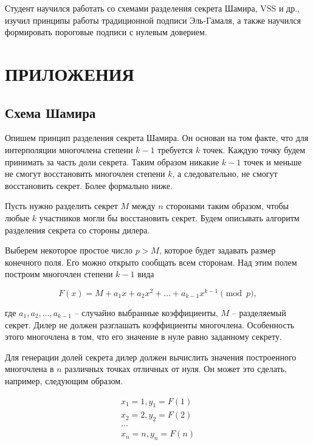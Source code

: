 \documentclass[a4paper,12pt]{article}
\theoremstyle{definition}
\begin{document}
	Студент научился работать со схемами разделения секрета Шамира, VSS и др., изучил принципы работы традиционной подписи Эль-Гамаля, а также научился формировать пороговые подписи с нулевым доверием. 
	
	
	
	\newpage
	\printbibliography[title={БИБЛИОГРАФИЧЕСКИЙ СПИСОК}]
	
	\newpage
	\section*{ПРИЛОЖЕНИЯ}
	
	\setcounter{subsection}{0}
	\renewcommand\thesubsection{\Asbuk{subsection}}
	
	\renewcommand\thealgocf{\thesubsection.\arabic{algocf}}
	
		\subsection{Схема Шамира} \label{applic:Shamir}
		
		Опишем принцип разделения секрета Шамира. Он основан на том факте, что для интерполяции многочлена степени $k-1$ требуется $k$ точек. Каждую точку будем принимать за часть доли секрета. Таким образом никакие $k-1$ точек и меньше не смогут восстановить многочлен степени $k$, а следовательно, не смогут восстановить секрет. Более формально ниже.
		
		Пусть нужно разделить секрет $M$ между $n$ сторонами таким образом, чтобы любые $k$ участников могли бы восстановить секрет. Будем описывать алгоритм разделения секрета со стороны дилера. 
		
		Выберем некоторое простое число $p>M$, которое будет задавать размер конечного поля. Его можно открыто сообщать всем сторонам. Над этим полем построим многочлен степени $k-1$ вида
		
		\[ F(x) = M + a_1 x + a_2 x^2 + \dots + a_{k-1} x^{k-1} \pmod p, \]
		
		где $a_1, a_2, \dots, a_{k-1}$ \--- случайно выбранные коэффициенты, $M$ \--- разделяемый секрет. Дилер не должен разглашать коэффициенты многочлена. Особенность этого многочлена в том, что его значение в нуле равно заданному секрету.
		
		Для генерации долей секрета дилер должен вычислить значения построенного многочлена в $n$ различных точках отличных от нуля. Он может это сделать, например, следующим образом.
		
		\begin{gather*}
			x_1=1, y_1 = F(1) \\
			x_2=2, y_2 = F(2) \\
			\dots 			  \\
			x_n=n, y_n = F(n) \\
		\end{gather*}
		
\end{document}
